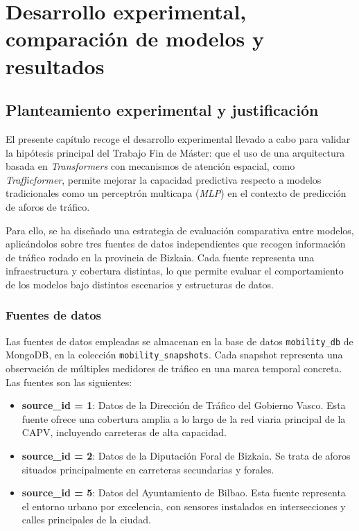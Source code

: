 \section{Desarrollo experimental, comparación de modelos y resultados}
\label{sec:desarrollo_comp_results}

%
%

\subsection{Planteamiento experimental y justificación}
\label{sec:planteamiento_experimental}

El presente capítulo recoge el desarrollo experimental llevado a cabo para validar la hipótesis principal del Trabajo Fin de Máster: que el uso de una arquitectura basada en \textit{Transformers} con mecanismos de atención espacial, como \textit{Trafficformer}, permite mejorar la capacidad predictiva respecto a modelos tradicionales como un perceptrón multicapa (\textit{MLP}) en el contexto de predicción de aforos de tráfico.

Para ello, se ha diseñado una estrategia de evaluación comparativa entre modelos, aplicándolos sobre tres fuentes de datos independientes que recogen información de tráfico rodado en la provincia de Bizkaia. Cada fuente representa una infraestructura y cobertura distintas, lo que permite evaluar el comportamiento de los modelos bajo distintos escenarios y estructuras de datos.

\subsubsection*{Fuentes de datos}
Las fuentes de datos empleadas se almacenan en la base de datos \texttt{mobility\_db} de MongoDB, en la colección \texttt{mobility\_snapshots}. Cada snapshot representa una observación de múltiples medidores de tráfico en una marca temporal concreta. Las fuentes son las siguientes:

\begin{itemize}
	\item \textbf{source\_id = 1}: Datos de la Dirección de Tráfico del Gobierno Vasco. Esta fuente ofrece una cobertura amplia a lo largo de la red viaria principal de la CAPV, incluyendo carreteras de alta capacidad.
	\item \textbf{source\_id = 2}: Datos de la Diputación Foral de Bizkaia. Se trata de aforos situados principalmente en carreteras secundarias y forales.
	\item \textbf{source\_id = 5}: Datos del Ayuntamiento de Bilbao. Esta fuente representa el entorno urbano por excelencia, con sensores instalados en intersecciones y calles principales de la ciudad.
\end{itemize}

